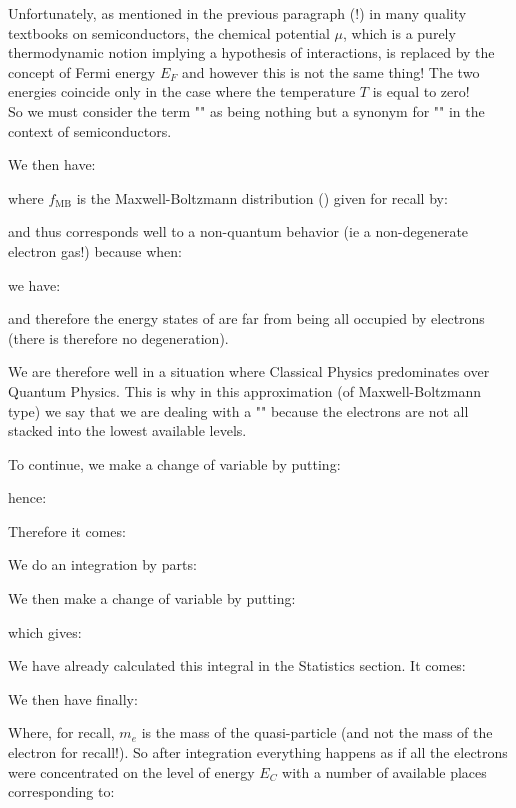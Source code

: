 	\begin{tcolorbox}[title=Remark,colframe=black,arc=10pt]
	Unfortunately, as mentioned in the previous paragraph (!) in many quality textbooks on semiconductors, the chemical potential $\mu$, which is a purely thermodynamic notion implying a hypothesis of interactions, is replaced by the concept of Fermi energy $E_F$ and however this is not the same thing! The two energies coincide only in the case where the temperature $T$ is equal to zero!\\

	So we must consider the term "" as being nothing but a synonym for "" in the context of semiconductors.
	\end{tcolorbox}
	We then have:
	
	where $f_{\text{MB}}$ is the Maxwell-Boltzmann distribution () given for recall by:
	
	and thus corresponds well to a non-quantum behavior (ie a non-degenerate electron gas!) because when:
	
	we have:
	
	and therefore the energy states of are far from being all occupied by electrons (there is therefore no degeneration).

	We are therefore well in a situation where Classical Physics predominates over Quantum Physics. This is why in this approximation (of Maxwell-Boltzmann type) we say that we are dealing with a "" because the electrons are not all stacked into the lowest available levels.

	To continue, we make a change of variable by putting:
	
	hence:
	
	Therefore it comes:
	
	We do an integration by parts:
	
	We then make a change of variable by putting:
	
	which gives:
	
	We have already calculated this integral in the Statistics section. It comes:
	
	We then have finally:
	
	Where, for recall, $m_e$ is the mass of the quasi-particle (and not the mass of the electron for recall!). So after integration everything happens as if all the electrons were concentrated on the level of energy $E_C$ with a number of available places corresponding to:
	
